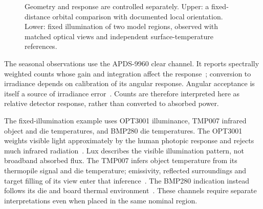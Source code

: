 \begin{figure}[t]
\centering
{}
\caption{Geometry and response are controlled separately. Upper: a fixed-distance orbital comparison with documented local orientation. Lower: fixed illumination of two model regions, observed with matched optical views and independent surface-temperature references.}
\label{fig:tidal-locking-apparatus}
\end{figure}

The seasonal observations use the APDS-9960 clear channel. It reports spectrally weighted counts whose gain and integration affect the response~\cite{apds9960}; conversion to irradiance depends on calibration of its angular response. Angular acceptance is itself a source of irradiance error~\cite{vijeta2021}. Counts are therefore interpreted here as relative detector response, rather than converted to absorbed power.

The fixed-illumination example uses OPT3001 illuminance, TMP007 infrared object and die temperatures, and BMP280 die temperatures. The OPT3001 weights visible light approximately by the human photopic response and rejects much infrared radiation~\cite{opt3001}. Lux describes the visible illumination pattern, not broadband absorbed flux. The TMP007 infers object temperature from its thermopile signal and die temperature; emissivity, reflected surroundings and target filling of its view enter that inference~\cite{tmp007}. The BMP280 indication instead follows its die and board thermal environment~\cite{bmp280}. These channels require separate interpretations even when placed in the same nominal region.

